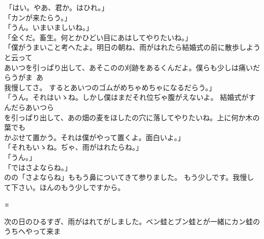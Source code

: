 \documentclass[
a4paper,
10pt,
book]
{tarticle}
\begin{document}
\begin{linenumbers}
    \noindent \,「はい。やあ、君か。はひれ。」\\
    「カンが来たらう。」\\
    「うん。いまいましいね。」\\
    「全くだ。畜生。何とかひどい目にあはしてやりたいね。」\\
    「僕がうまいこと考へたよ。明日の朝ね、雨がはれたら結婚式の前に散歩しようと云って\\
    \indent あいつを引っぱり出して、あそこのの刈跡をあるくんだよ。僕らも少しは痛いだらうがま~あ\\
    \indent 我慢してさ。
    するとあいつのゴムがめちゃめちゃになるだらう。」\\
    「うん。それはいゝね。しかし僕はまだそれ位ぢゃ腹がえないよ。
    結婚式がすんだらあいつら\\
    \indent を引っぱり出して、あの畑の麦をほしたの穴に落してやりたいね。上に何か木の葉でも\\
    \indent かぶせて置かう。それは僕がやって置くよ。面白いよ。」\\
    「それもいゝね。ぢゃ、雨がはれたらね。」\\
    「うん。」\\
    「ではさよならね。」\\
    \indent {}のの「さよならね」ももう鼻についてきて参りました。
    もう少しです。我慢して下さい。ほんのもう少しですから。
\end{linenumbers}

\indent \indent \indent \indent \indent \indent \indent \indent \indent \indent ※

\begin{linenumbers}
    \indent 次の日のひるすぎ、雨がはれてがしました。ベン蛙とブン蛙とが一緒にカン蛙のうちへやって来ま
\end{linenumbers}
\end{document}
